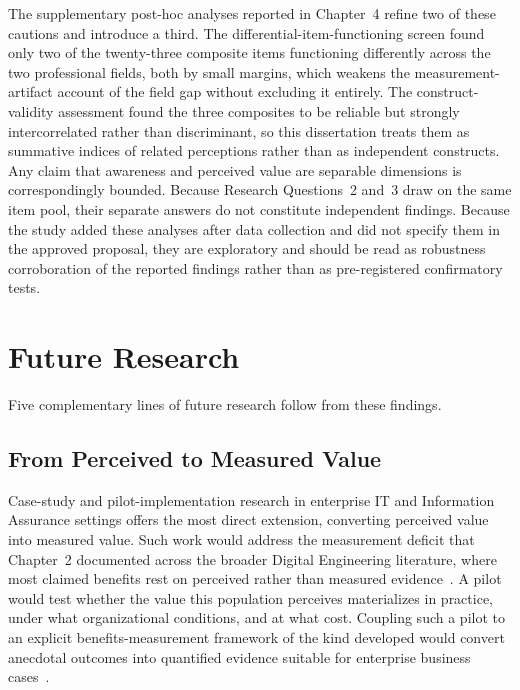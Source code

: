 The supplementary post-hoc analyses reported in Chapter~4 refine two of these cautions and introduce a third. The differential-item-functioning screen found only two of the twenty-three composite items functioning differently across the two professional fields, both by small margins, which weakens the measurement-artifact account of the field gap without excluding it entirely. The construct-validity assessment found the three composites to be reliable but strongly intercorrelated rather than discriminant, so this dissertation treats them as summative indices of related perceptions rather than as independent constructs. Any claim that awareness and perceived value are separable dimensions is correspondingly bounded. Because Research Questions~2 and~3 draw on the same item pool, their separate answers do not constitute independent findings. Because the study added these analyses after data collection and did not specify them in the approved proposal, they are exploratory and should be read as robustness corroboration of the reported findings rather than as pre-registered confirmatory tests.

\section{Future Research}

Five complementary lines of future research follow from these findings.

\subsection{From Perceived to Measured Value}

Case-study and pilot-implementation research in enterprise IT and Information Assurance settings offers the most direct extension, converting perceived value into measured value. Such work would address the measurement deficit that Chapter~2 documented across the broader Digital Engineering literature, where most claimed benefits rest on perceived rather than measured evidence~\parencite{Henderson_Salado_2021, Rogers_Mitchell_2021}. A pilot would test whether the value this population perceives materializes in practice, under what organizational conditions, and at what cost. Coupling such a pilot to an explicit benefits-measurement framework of the kind \citeauthor{Henderson_2023_Metrics} developed would convert anecdotal outcomes into quantified evidence suitable for enterprise business cases~\parencite{Henderson_2023_Metrics}.

